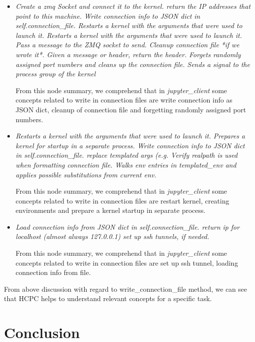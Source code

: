 \begin{itemize}
    \item \emph{Create a zmq Socket and connect it to the kernel. return the IP addresses that point to this machine. Write connection info to JSON dict in self.connection\_file. Restarts a kernel with the arguments that were used to launch it. Restarts a kernel with the arguments that were used to launch it. Pass a message to the ZMQ socket to send. Cleanup connection file *if we wrote it*. Given a message or header, return the header. Forgets randomly assigned port numbers and cleans up the connection file. Sends a signal to the process group of the kernel }
    
    From this node summary, we comprehend that in \emph{jupyter\_client} some concepts related to write in connection files are write connection info as JSON dict, cleanup of connection file and forgetting randomly assigned port numbers.
    
    \item \emph{ Restarts a kernel with the arguments that were used to launch it. Prepares a kernel for startup in a separate process. Write connection info to JSON dict in self.connection\_file. replace templated args (e.g. Verify realpath is used when formatting connection file. Walks env entries in templated\_env and applies possible substitutions from current env.}
    
    From this node summary, we comprehend that in \emph{jupyter\_client} some concepts related to write in connection files are restart kernel, creating environments and prepare a kernel startup in separate process.
    
    \item \emph{Load connection info from JSON dict in self.connection\_file. return ip for localhost (almost always 127.0.0.1) set up ssh tunnels, if needed.} 
    
    From this node summary, we comprehend that in \emph{jupyter\_client} some concepts related to write in connection files are set up ssh tunnel, loading connection info from file.
    
    
\end{itemize}

From above discussion with regard to write\_connection\_file method, we can see that HCPC helps to understand relevant concepts for a specific task. 
\section{Conclusion}

